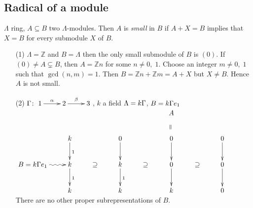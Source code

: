 \subsection{Radical of a module}
\begin{defin}
$\Lambda$ ring, $A \subseteq B$ two $\Lambda$-modules. Then 
$A$ is \emph{small} in $B$ if $A+X=B$ implies
that $X=B$ for every submodule $X$ of $B$.  
\end{defin}

\begin{exam}
\begin{enumerate}
\item[(1)] $\Lambda=\mathbb{Z}$ and $B=\Lambda$ then the only small
  submodule of $B$ is $(0)$. If $(0)\neq A \subsetneq B$, then $A =
  \mathbb{Z}n$ for some $n \neq 0,\; 1$. Choose an integer $m \neq 0,
  \; 1$ such that $\gcd(n, m) = 1$. Then $B = \mathbb{Z}n +
  \mathbb{Z}m = A + X$ but $X \neq B$. Hence $A$ is not small. 

\item[(2)] $\G \colon \xymatrix{1\ar[r]^\alpha & 2\ar[r]^\beta & 3}$, $k$ a field $\Lambda = k\Gamma$, $B=k\Gamma e_1$\\
$\xymatrix{
							&					&			& && A\ar@{}[d]|-*[@]{=} &&\\
							& k \ar@{->}[d]^1 	&			&0\ar@{->}[d]&&0\ar@{->}[d]&&0\ar@{->}[d]\\
B = k\G e_1	\ar@{~>}[r] 	& k \ar@{->}[d]^1 	&\supseteq 	&k\ar@{->}[d]^1&\supseteq&0\ar@{->}[d]&\supseteq&0\ar@{->}[d]\\
						 	& k 				&			&k&&k&&0\\
}$\\
There are no other proper subrepresentations of $B$.


\end{enumerate}
\end{exam}
